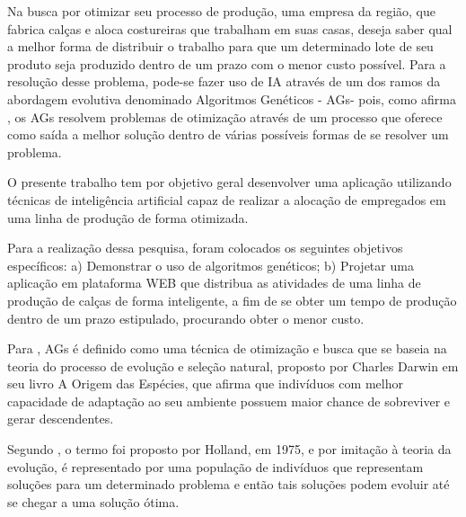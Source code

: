 \par Na busca por otimizar seu processo de produção, uma empresa da região, que
fabrica calças e aloca costureiras que trabalham em suas casas, deseja saber
qual a melhor forma de distribuir o trabalho para que um determinado lote de seu produto
seja produzido dentro de um prazo com o menor custo possível. Para a resolução
desse problema, pode-se fazer uso de IA através de um dos ramos da abordagem
evolutiva denominado Algoritmos Genéticos - AGs\footnotemark[2] - pois, como
afirma , os AGs resolvem problemas de
otimização através de um processo que oferece como saída a melhor solução
dentro de várias possíveis formas de se resolver um problema.



\par O presente trabalho tem por objetivo geral desenvolver uma aplicação
utilizando técnicas de inteligência artificial capaz de realizar a alocação
de empregados em uma linha de produção de forma otimizada. 
\par Para a realização dessa pesquisa, foram colocados os seguintes objetivos
específicos: a) Demonstrar o uso de algoritmos genéticos; b) Projetar uma aplicação em plataforma WEB que distribua as
atividades de uma linha de produção de calças de forma inteligente, a fim de se
obter um tempo de produção dentro de um prazo estipulado, procurando obter o menor custo.

\par Para , AGs é definido
como uma técnica de otimização e busca que se baseia na teoria do processo de evolução e seleção
natural, proposto por Charles Darwin em seu livro A Origem das Espécies, que
afirma que indivíduos com melhor capacidade de adaptação ao seu ambiente possuem
maior chance de sobreviver e gerar descendentes.

\par Segundo , o termo foi proposto
por Holland, em 1975, e por imitação à teoria da evolução, é representado por
uma população de indivíduos que representam soluções para um determinado problema e então tais soluções
podem evoluir até se chegar a uma solução ótima.

